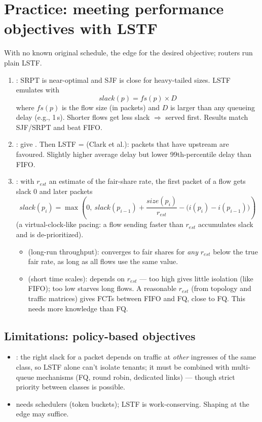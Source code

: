 \section{Practice: meeting performance objectives with LSTF}
With no known original schedule, the edge  for the desired objective; routers run plain LSTF.
\begin{enumerate}
\item {}: SRPT is near-optimal and SJF is close for heavy-tailed sizes. LSTF emulates  with
\[ slack(p) = fs(p)\times D \]
where $fs(p)$ is the flow size (in packets) and $D$ is larger than any queueing delay (e.g., 1\,s). Shorter flows get less slack $\Rightarrow$ served first. Results match SJF/SRPT and beat FIFO.
\item {}: give . Then LSTF =  (Clark et al.): packets that have  upstream are favoured. Slightly higher average delay but lower 99th-percentile delay than FIFO.
\item {}: with $r_{est}$ an estimate of the fair-share rate, the first packet of a flow gets slack 0 and later packets
\[ slack(p_i) = \max\left(0,\ slack(p_{i-1}) + \frac{size(p_i)}{r_{est}} - \big(i(p_i) - i(p_{i-1})\big)\right) \]
(a virtual-clock-like pacing: a flow sending faster than $r_{est}$ accumulates slack and is de-prioritized).
\begin{itemize}
\item {} (long-run throughput): converges to fair shares for \emph{any} $r_{est}$ below the true fair rate, as long as all flows use the same value.
\item {} (short time scales): depends on $r_{est}$ --- too high gives little isolation (like FIFO); too low starves long flows. A reasonable $r_{est}$ (from topology and traffic matrices) gives FCTs between FIFO and FQ, close to FQ. This needs more knowledge than FQ.
\end{itemize}
\end{enumerate}

\subsection{Limitations: policy-based objectives}
\begin{itemize}
\item {}: the right slack for a packet depends on traffic at \emph{other} ingresses of the same class, so LSTF alone can't isolate tenants; it must be combined with multi-queue mechanisms (FQ, round robin, dedicated links) --- though strict priority between classes is possible.
\item {} needs  schedulers (token buckets); LSTF is work-conserving. Shaping at the edge may suffice.
\end{itemize}

